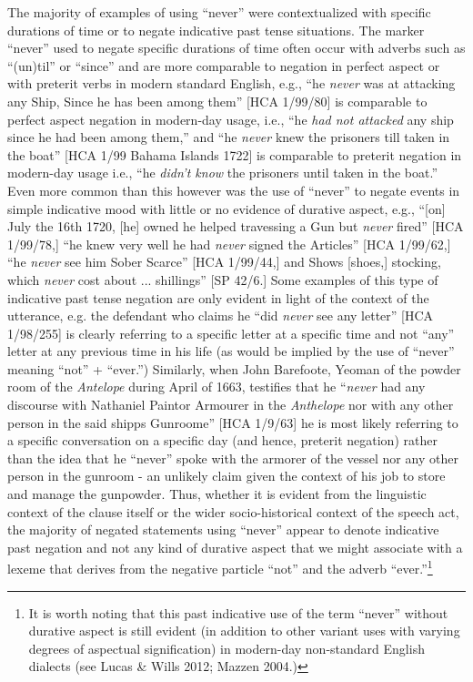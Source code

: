\begin{styleStandard}
The majority of examples of using “never” were contextualized with specific durations of time or to negate indicative past tense situations. The marker “never” used to negate specific durations of time often occur with adverbs such as “(un)til” or “since” and are more comparable to negation in perfect aspect or with preterit verbs in modern standard English, e.g., “he \textit{never }was at attacking any Ship, Since he has been among them” [HCA 1/99/80] is comparable to perfect aspect negation in modern-day usage, i.e., “he \textit{had not attacked} any ship since he had been among them,” and “he \textit{never} knew the prisoners till taken in the boat” [HCA 1/99 Bahama Islands 1722] is comparable to preterit negation in modern-day usage i.e., “he \textit{didn't know} the prisoners until taken in the boat.” Even more common than this however was the use of “never” to negate events in simple indicative mood with little or no evidence of durative aspect, e.g., “[on] July the 16th 1720, [he] owned he helped travessing a Gun but \textit{never} fired” [HCA 1/99/78,] “he knew very well he had \textit{never }signed the Articles” [HCA 1/99/62,] “he \textit{never} see him Sober Scarce” [HCA 1/99/44,] and {\textquotedbl}Shows [shoes,] stocking, which \textit{never} cost about ... shillings” [SP 42/6.] Some examples of this type of indicative past tense negation are only evident in light of the context of the utterance, e.g. the defendant who claims he “did \textit{never} see any letter” [HCA 1/98/255] is clearly referring to a specific letter at a specific time and not “any” letter at any previous time in his life (as would be implied by the use of “never” meaning “not” + “ever.”) Similarly, when John Barefoote, Yeoman of the powder room of the \textit{Antelope} during April of 1663, testifies that he “\textit{never }had any discourse with Nathaniel Paintor Armourer in the \textit{Anthelope} nor with any other person in the said shipps Gunroome” [HCA 1/9/63] he is most likely referring to a specific conversation on a specific day (and hence, preterit negation) rather than the idea that he “never” spoke with the armorer of the vessel nor any other person in the gunroom - an unlikely claim given the context of his job to store and manage the gunpowder. Thus, whether it is evident from the linguistic context of the clause itself or the wider socio-historical context of the speech act, the majority of negated statements using “never” appear to denote indicative past negation and not any kind of durative aspect that we might associate with a lexeme that derives from the negative particle “not” and the adverb “ever.”\footnote{ It is worth noting that this past indicative use of the term “never” without durative aspect is still evident (in addition to other variant uses with varying degrees of aspectual signification) in modern-day non-standard English dialects (see Lucas \& Wills 2012; Mazzen 2004.) } 
\end{styleStandard}

